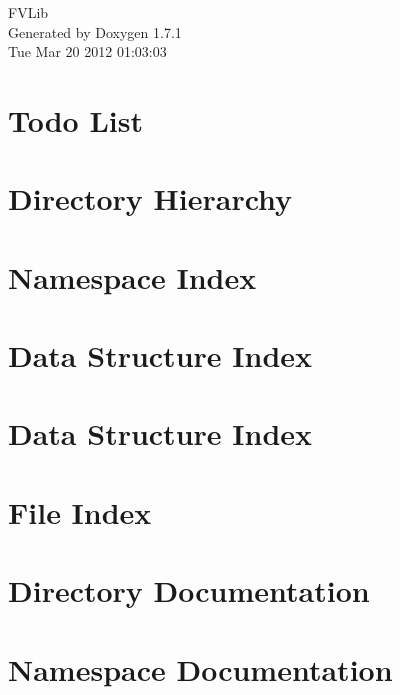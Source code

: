 \documentclass[a4paper]{book}
\begin{document}
\hypersetup{pageanchor=false}
\begin{titlepage}
\vspace*{7cm}
\begin{center}
{\Large FVLib }\\
\vspace*{1cm}
{\large Generated by Doxygen 1.7.1}\\
\vspace*{0.5cm}
{\small Tue Mar 20 2012 01:03:03}\\
\end{center}
\end{titlepage}
\clearemptydoublepage
{}
\tableofcontents
\clearemptydoublepage
{}
\hypersetup{pageanchor=true}
\chapter{Todo List}
\label{todo}
\hypertarget{todo}{}

\chapter{Directory Hierarchy}

\chapter{Namespace Index}

\chapter{Data Structure Index}

\chapter{Data Structure Index}

\chapter{File Index}

\chapter{Directory Documentation}



\chapter{Namespace Documentation}

\end{document}
